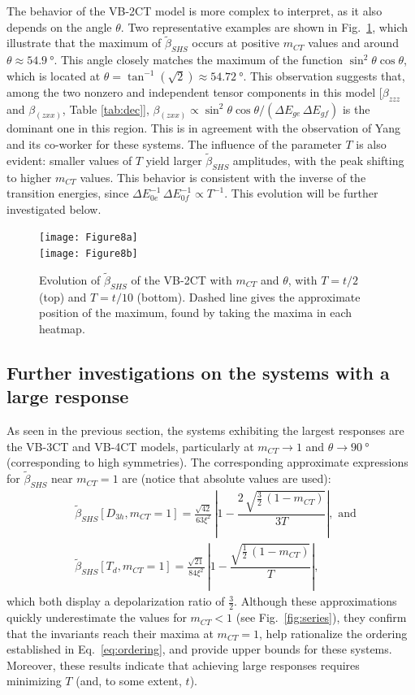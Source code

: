 \documentclass[USenglish]{article}
\begin{document}
The behavior of the VB-2CT model is more complex to interpret, as it also depends on the angle $\theta$. Two representative examples are shown in Fig.~\ref{fig:3sttheta}, which illustrate that the maximum of $\tilde\beta_{SHS}$ occurs at positive $m_{CT}$ values and around $\theta \approx \SI{54.9}{\degree}$. This angle closely matches the maximum of the function $\sin^2\theta\cos\theta$, which is located at $\theta = \tan^{-1}(\sqrt{2}) \approx \SI{54.72}{\degree}$. This observation suggests that, among the two nonzero and independent tensor components in this model [$\beta_{zzz}$ and $\beta_{(zxx)} $, Table \ref{tab:dec}], $\beta_{(zxx)} \propto \sin^2\theta\cos\theta / (\Delta E_{ge}\,\Delta E_{gf})$ is the dominant one in this region.  This is in agreement with the observation of Yang and its co-worker \cite{yangLargeOffDiagonalContribution2003} for these systems.
The influence of the parameter $T$ is also evident: smaller values of $T$ yield larger $\tilde\beta_{SHS}$ amplitudes, with the peak shifting to higher $m_{CT}$ values. This behavior is consistent with the inverse of the transition energies, since $\Delta E_{0e}^{-1}\,\Delta E_{0f}^{-1} \propto T^{-1}$. This evolution will be further investigated below.


\begin{figure}[!h]
	\texttt{[image: Figure8a]}\\
	\texttt{[image: Figure8b]}
	\caption{Evolution of $\tilde\beta_{SHS}$  of the VB-2CT with $m_{CT}$ and $\theta$, with $T=t/2$ (top) and $T=t/10$ (bottom). Dashed line gives the approximate position of the maximum, found by taking the maxima in each heatmap.}
	\label{fig:3sttheta}
\end{figure}

\clearpage
\subsection{Further investigations on the systems with a large response}

As seen in the previous section, the systems exhibiting the largest responses are the VB-3CT and VB-4CT models, particularly at $m_{CT} \to 1$ and $\theta \to \SI{90}{\degree}$ (corresponding to high symmetries). The corresponding approximate expressions for $\tilde\beta_{SHS}$ near $m_{CT} = 1$ are (notice that absolute values are used):\begin{align}
	&\tilde\beta_{SHS}[D_{3h}, m_{CT}=1] = \frac{\sqrt{42}}{63\xi^2}\,\left|1-\dfrac{2\,\sqrt{\frac{3}{2}\,(1-m_{CT})}}{3T}\right|, \text{ and}\label{eq:highsym4}\\ &\tilde\beta_{SHS}[T_d, m_{CT}=1]  = \frac{\sqrt{21}}{84\xi^2}\,\left|1-\dfrac{\sqrt{\frac{1}{2}\,(1-m_{CT})}}{T}\right|,\label{eq:highsym5}
\end{align}
which both display a depolarization ratio of $\frac{3}{2}$.
Although these approximations quickly underestimate the values for $m_{CT} < 1$ (see Fig.~\ref{fig:series}), they confirm that the invariants reach their maxima at $m_{CT} = 1$, help rationalize the ordering established in Eq.~\eqref{eq:ordering}, and provide upper bounds for these systems. 
Moreover, these results indicate that achieving large responses requires minimizing $T$ (and, to some extent, $t$).
\end{document}
